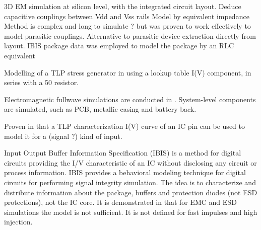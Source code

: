 3D EM simulation \cite{LacrampeTransientImmunity} at silicon level, with the integrated circuit layout.
Deduce capacitive couplings between Vdd and Vss rails
Model by equivalent impedance
Method is complex and long to simulate ? but was proven to work effectively to model parasitic couplings.
Alternative to parasitic device extraction directly from layout.
IBIS package data was employed to model the package by an RLC equivalent

%
Modelling of a TLP stress generator in \cite{LacrampeTransientImmunity} using a lookup table I(V) component, in series with a 50\textOmega{} resistor.

Electromagnetic fullwave simulations are conducted in \cite{softFailMobile}.
System-level components are simulated, such as PCB, metallic casing and battery back.

Proven in \cite{usb2ESDProtection} that a TLP characterization I(V) curve of an IC pin can be used to model it for a (signal ?) kind of input.

Input Output Buffer Information Specification (IBIS) \cite{ibis-spec} is a method for digital circuits providing the I/V characteristic of an IC without disclosing any circuit or process information.
IBIS provides a behavioral modeling technique for digital circuits for performing signal integrity simulation.
The idea is to characterize and distribute information about the package, buffers and protection diodes (not ESD protections), not the IC core.
It is demonstrated in \cite{ibisImprovementFabrice} that for EMC and ESD simulations the model is not sufficient.
It is not defined for fast impulses and high injection.
